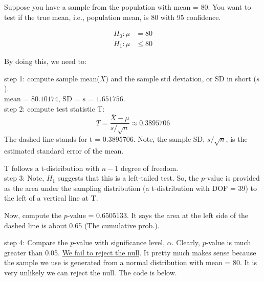 \documentclass[12pt]{article}
\begin{document}
Suppose you have a sample from the population with mean = 80. You
want to test if the true mean, i.e., population mean, is 80 with 95
confidence.

\begin{align*}
H_0: \mu &= 80\\
H_1: \mu &\le 80
\end{align*}



By doing this, we need to:

step 1: compute sample mean($  \overline{X} $) and the sample std 
deviation, or SD in short ($ s $).\\
mean = $ 80.10174 $, SD = $ s $ = $ 1.651756 $.
\\

step 2: compute test statistic T:
\begin{equation*}
T = \frac{ \overline{X} - \mu}{s/\sqrt {n}} \approx 0.3895706
\end{equation*}	
The dashed line stands for t = 0.3895706.
Note, the sample SD, $ s/\sqrt {n} $, is the estimated standard 
error of the mean.

T follows a t-distribution with $ n - 1 $ degree of freedom.\\

step 3: Note, $ H_1 $ suggests that this is a left-tailed test. So,
the $ p $-value is provided as the area under the sampling distribution
(a t-distribution with DOF = 39) to the left of a vertical line at T.

Now, compute the $ p $-value = $ 0.6505133 $. It says the area at the
left side of the dashed line is about 0.65 (The cumulative prob.).


step 4: Compare the $ p $-value with significance level, $ \alpha $.
Clearly, $ p $-value is much greater than 0.05. 
{\underline {We fail to reject the null}}. It pretty much makes sense
because the sample we use is generated from a normal distribution with
mean = 80. It is very unlikely we can reject the null. The code is 
below.
\end{document}
